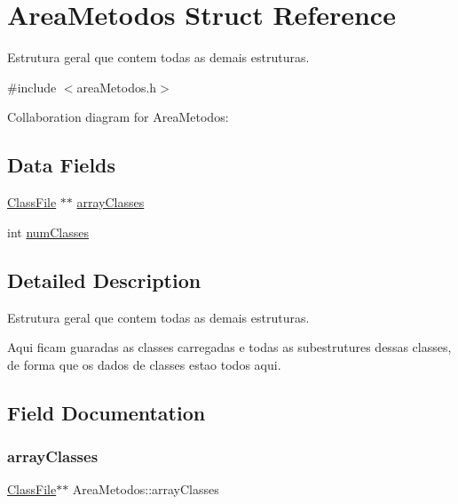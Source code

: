 \hypertarget{structAreaMetodos}{}\section{Area\+Metodos Struct Reference}
\label{structAreaMetodos}


Estrutura geral que contem todas as demais estruturas.  




{\ttfamily \#include $<$area\+Metodos.\+h$>$}



Collaboration diagram for Area\+Metodos\+:
\subsection*{Data Fields}
\begin{DoxyCompactItemize}
\item 
\hyperlink{structClassFile}{Class\+File} $\ast$$\ast$ \hyperlink{structAreaMetodos_a2f53ae03ffa9b13b9866efb46811c988}{array\+Classes}
\item 
int \hyperlink{structAreaMetodos_a16f79347136c9dda54c97a62bd596887}{num\+Classes}
\end{DoxyCompactItemize}


\subsection{Detailed Description}
Estrutura geral que contem todas as demais estruturas. 

Aqui ficam guaradas as classes carregadas e todas as subestrutures dessas classes, de forma que os dados de classes estao todos aqui. 

\subsection{Field Documentation}
\mbox{\label{structAreaMetodos_a2f53ae03ffa9b13b9866efb46811c988}} 
\subsubsection{\texorpdfstring{array\+Classes}{arrayClasses}}
{\footnotesize\ttfamily \hyperlink{structClassFile}{Class\+File}$\ast$$\ast$ Area\+Metodos\+::array\+Classes}

